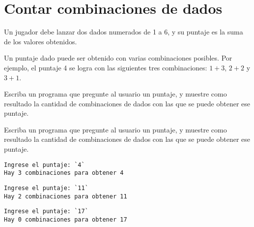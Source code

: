 \section{Contar combinaciones de dados}

Un jugador debe lanzar dos dados numerados de 1 a 6, y su puntaje es la
suma de los valores obtenidos.

Un puntaje dado puede ser obtenido con varias combinaciones posibles.
Por ejemplo, el puntaje 4 se logra con las siguientes tres
combinaciones: \(1+3\), \(2+2\) y \(3+1\).

Escriba un programa que pregunte al usuario un puntaje, y muestre como
resultado la cantidad de combinaciones de dados con las que se puede
obtener ese puntaje.

Escriba un programa que pregunte al usuario un puntaje,
y muestre como resultado la cantidad de combinaciones de dados
con las que se puede obtener ese puntaje.

\begin{lstlisting}[language=testcase]
Ingrese el puntaje: `4`
Hay 3 combinaciones para obtener 4
\end{lstlisting}

\begin{lstlisting}[language=testcase]
Ingrese el puntaje: `11`
Hay 2 combinaciones para obtener 11
\end{lstlisting}

\begin{lstlisting}[language=testcase]
Ingrese el puntaje: `17`
Hay 0 combinaciones para obtener 17
\end{lstlisting}


